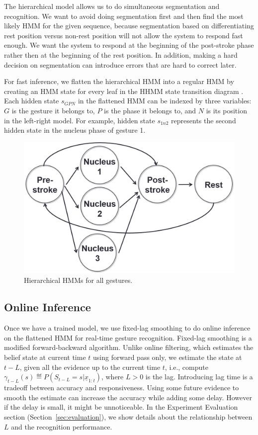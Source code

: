 The hierarchical model allows us to do simultaneous segmentation and
recognition. We want to avoid doing segmentation first and then find the most
likely HMM for the given sequence, because segmentation based on
differentiating rest position versus non-rest position will not allow the system
to respond fast enough. We want the system to respond at the beginning of the
post-stroke phase rather then at the beginning of the rest position. In
addition, making a hard decision on segmentation can introduce errors that
are hard to correct later. 

For fast inference, we
flatten the hierarchical HMM into a regular HMM by creating an HMM state for
every leaf in the HHMM state transition diagram \cite{murphy02}. Each
hidden state $s_{GPN}$ in the flattened HMM can be indexed by three variables:
$G$ is the gesture it belongs to, $P$ is the phase it belongs to, and $N$ is its
position in the left-right model. For example, hidden state $s_{1n2}$ represents the
second hidden state in the nucleus phase of gesture 1.

\begin{figure}[t]
\centering
\includegraphics[width=0.7\columnwidth]{figures/combined.png}
\caption{Hierarchical HMMs for all gestures.}
\label{fig:combined}
\end{figure}

\subsection{Online Inference}
Once we have a trained model, we use fixed-lag smoothing \cite{murphy02} to do
online inference on the flattened HMM for real-time gesture recognition.
Fixed-lag smoothing is a modified forward-backward algorithm. Unlike online
filtering, which estimates the belief state at current time $t$ using forward
pass only, we estimate the state at $t - L$, given all the evidence up to the
current time $t$, i.e., compute $\gamma_{t - L}(s) \eqdef P(S_{t -
L} = s|\underline{x}_{1:t})$, where $L > 0$ is the lag. Introducing lag time is
a tradeoff between accuracy and responsiveness. Using some future evidence to
smooth the estimate can increase the accuracy while adding some delay. However
if the delay is small, it might be unnoticeable.
In the Experiment Evaluation section (Section~\ref{sec:evaluation}), we show
details about the relationship between $L$ and the recognition performance.

